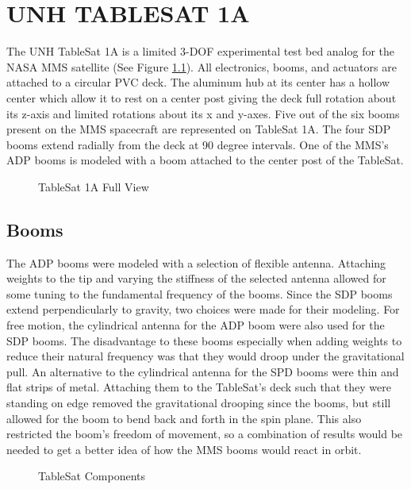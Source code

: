 
\chapter{UNH TABLESAT 1A}
\label{chap:UNHTableSat1A}

The UNH TableSat 1A is a limited 3-DOF experimental test bed analog for the NASA MMS satellite (See Figure \ref{fig:TSatFullView}).  All electronics, booms, and actuators are attached to a circular PVC deck.  The aluminum hub at its center has a hollow center which allow it to rest on a center post giving the deck full rotation about its z-axis and limited rotations about its x and y-axes.  Five out of the six booms present on the MMS spacecraft are represented on TableSat 1A.  The four SDP booms extend radially from the deck at 90 degree intervals.  One of the MMS's ADP booms is modeled with a boom attached to the center post of the TableSat.

\begin{figure}[H]
\centerline{}
\caption{TableSat 1A Full View}
\label{fig:TSatFullView}
\end{figure}

\section{Booms}
\label{sec:Booms}

The ADP booms were modeled with a selection of flexible antenna.  Attaching weights to the tip and varying the stiffness of the selected antenna allowed for some tuning to the fundamental frequency of the booms.  Since the SDP booms extend perpendicularly to gravity, two choices were made for their modeling.  For free motion, the cylindrical antenna for the ADP boom were also used for the SDP booms.  The disadvantage to these booms especially when adding weights to reduce their natural frequency was that they would droop under the gravitational pull.  An alternative to the cylindrical antenna for the SPD booms were thin and flat strips of metal.  Attaching them to the TableSat's deck such that they were standing on edge removed the gravitational drooping since the booms, but still allowed for the boom to bend back and forth in the spin plane.  This also restricted the boom's freedom of movement, so a combination of results would be needed to get a better idea of how the MMS booms would react in orbit.

\begin{figure}[H]
\centerline{}
\caption{TableSat Components}
\label{fig:TSatComponents}
\end{figure}

